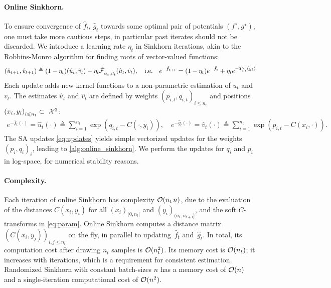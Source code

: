 \paragraph{Online Sinkhorn.}

To ensure convergence of $\hat f_t$, $\hat g_t$ towards some optimal pair of potentials
$(f^\star, g^\star)$, one must take more cautious steps, in particular past iterates should not be discarded. 
%
We introduce a learning
rate $\eta_t$ in Sinkhorn iterations, akin to the Robbins-Monro algorithm for finding
roots of vector-valued functions:
\begin{equation}\label{eq:updates}
    (\hat u_{t+1}, \hat v_{t+1}) \triangleq (1 - \eta_t) (\hat u_t, \hat v_t) 
    - \eta_t \hat \Ff_{\hat \alpha_t, \hat \beta_t}(\hat u_t, \hat v_t),\quad\text{i.e.}\quad
    e^{-\hat f_{t+1}} = (1 - \eta_t) e^{-\hat f_{t}} + 
    \eta_t e^{-\Ctrans{\hat g_t}{\hat \beta_t}}
\end{equation}
Each update adds new kernel functions to a non-parametric estimation of $
u_t$ and $v_t$. The estimates $\hat u_t$ and $\hat v_t$ are defined by weights ${(p_{i,t},
q_{i,t})}_{i \leq n_t}$ and positions ${(x_i, y_i)}_{i \leq n_t} \subset~\Xx^2$:
\begin{align}\label{eq:param}
    e^{-\hat f_t(\cdot)} = \hat u_t(\cdot) \triangleq \sum_{i=1}^{n_t} 
    \exp(q_{i,t} - C(\cdot, y_i)),\quad
    e^{-\hat g_t(\cdot)} = \hat v_t(\cdot) \triangleq \sum_{i=1}^{n_t}
    \exp(p_{i,t} - C(x_i, \cdot)).
\end{align}
The SA updates \eqref{eq:updates} yields simple vectorized updates for the weights
${(p_i,q_i)}_i$, leading to \autoref{alg:online_sinkhorn}. We perform
the updates for $q_i$ and $p_i$ in log-space, for numerical stability reasons.

\paragraph{Complexity.}

Each iteration of online Sinkhorn has complexity $\Oo(n_t\,n)$, due to the evaluation of the
distances $C(x_i, y_i)$ for all $(x_i)_{(0, n_t]}$ and $(y_i)_{(n_t, n_{t+1}]}$,
and the soft $C$-transforms in \eqref{eq:param}. Online Sinkhorn computes a
distance matrix $(C(x_i,y_j))_{i,j \leq n_t}$ on the fly, in parallel to
updating~$\hat f_t$ and~$\hat g_t$. In total, its computation cost after drawing
$n_t$ samples is $\Oo(n_t^2)$. Its memory cost is $\Oo(n_t)$; it increases with
iterations, which is a requirement for consistent estimation. Randomized
Sinkhorn with constant batch-sizes $n$ has a memory cost of $\Oo(n)$ and a
single-iteration computational cost of $\Oo(n^2)$.

